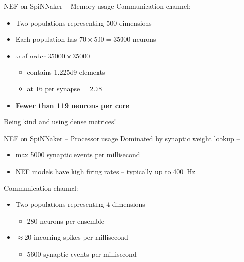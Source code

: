 \documentclass[handout,t]{beamer}
\begin{document}
  \begin{frame}{NEF on SpiNNaker -- Memory usage}
    Communication channel:
    \begin{itemize}
      \item Two populations representing 500 dimensions
      \item Each population has $70 \times 500 = \num{35000}$ neurons
      \item $\omega$ of order $\num{35000} \times \num{35000}$
      \begin{itemize}
        \item contains \num{1.225d9} elements
        \item at \SI{16}{\bit} per synapse = \SI{2.28}{\gibi\byte}
      \end{itemize}
      \item \textbf{Fewer than 119 neurons per core}
    \end{itemize}

    \vfill
    {\footnotesize Being kind and using dense matrices!}
  \end{frame}

  \begin{frame}{NEF on SpiNNaker -- Processor usage}
    Dominated by synaptic weight lookup --
    \begin{itemize}
      \item max 5000 synaptic events per millisecond
      \item NEF models have high firing rates -- typically up to \SI{400}{\hertz}
    \end{itemize}

    Communication channel:
    \begin{itemize}
      \item Two populations representing 4 dimensions
      \begin{itemize}
        \item 280 neurons per ensemble
      \end{itemize}
      \item $\approx 20$ incoming spikes per millisecond
      \begin{itemize}
        \item \num{5600} synaptic events per millisecond
      \end{itemize}
    \end{itemize}
  \end{frame}
\end{document}
